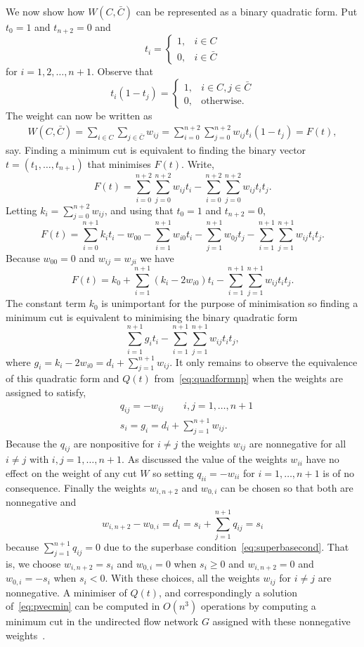 \documentclass[final,leqno]{siamltex}
\begin{document}
We now show how $W(C,\bar{C})$ can be represented as a binary quadratic form.  Put $t_0 = 1$ and $t_{n+2} = 0$ and
\[
t_i = \begin{cases}
1, & i \in C \\
0, & i \in \bar{C}
\end{cases}
\]
for $i = 1,2,\dots,n+1$.  Observe that
\[
t_i(1 - t_j) = \begin{cases}
1, & i \in C, j \in \bar{C} \\
0, & \text{otherwise}.
\end{cases}
\]
The weight can now be written as
\begin{align*}
W(C,\bar{C}) = \sum_{i \in C} \sum_{j \in \bar{C}} w_{ij} = \sum_{i =0}^{n+2} \sum_{j =0}^{n+2} w_{ij} t_i (1 - t_j) = F(t),
\end{align*}
say.  Finding a minimum cut is equivalent to finding the binary vector $t = (t_1, \dots, t_{n+1})$ that minimises $F(t)$.  Write,
\[
F(t) =  \sum_{i=0}^{n+2} \sum_{j =0}^{n+2} w_{ij}t_i - \sum_{i=0}^{n+2} \sum_{j =0}^{n+2} w_{ij} t_it_j.
\]
Letting $k_i = \sum_{j =0}^{n+2} w_{ij}$, and using that $t_0 = 1$ and $t_{n+2} = 0$,
\[
F(t) = \sum_{i=0}^{n+1}k_it_i  - w_{00} - \sum_{i=1}^{n+1} w_{i0} t_i - \sum_{j=1}^{n+1} w_{0j} t_j - \sum_{i=1}^{n+1} \sum_{j =1}^{n+1} w_{ij} t_it_j.
\]
Because $w_{00} = 0$ and $w_{ij} = w_{ji}$ we have
\[
F(t) = k_0 + \sum_{i=1}^{n+1}( k_i  - 2 w_{i0}) t_i  - \sum_{i=1}^{n+1} \sum_{j =1}^{n+1} w_{ij} t_it_j.
\]
The constant term $k_0$ is unimportant for the purpose of minimisation so finding a minimum cut is equivalent to minimising the binary quadratic form
\[
\sum_{i=1}^{n+1}g_i t_i  - \sum_{i=1}^{n+1} \sum_{j =1}^{n+1} w_{ij} t_it_j,
\]
where $g_i = k_i  - 2 w_{i0} = d_i + \sum_{j=1}^{n+1} w_{ij}$.  It only remains to observe the equivalence of this quadratic form and $Q(t)$ from~\eqref{eq:quadformnp} when the weights are assigned to satisfy,
\begin{align*}
&q_{ij} = - w_{ij} \qquad i,j = 1,\dots,n+1 \\
&s_i = g_i = d_i + \sum_{j=1}^{n+1} w_{ij}.
\end{align*}
Because the $q_{ij}$ are nonpositive for $i \neq j$ the weights $w_{ij}$ are nonnegative for all $i \neq j$ with $i,j = 1,\dots,n+1$.  As discussed the value of the weights $w_{ii}$ have no effect on the weight of any cut $W$ so setting $q_{ii} = - w_{ii}$ for  $i = 1,\dots,n+1$ is of no consequence.  Finally the weights $w_{i,n+2}$ and $w_{0,i}$ can be chosen so that both are nonnegative and 
\[
w_{i,n+2} - w_{0,i} = d_i = s_i + \sum_{j=1}^{n+1} q_{ij} = s_i
\]  
because $\sum_{j=1}^{n+1} q_{ij} = 0$ due to the superbase condition~\eqref{eq:superbasecond}.  That is, we choose $w_{i,n+2} = s_i$ and $w_{0,i} = 0$ when $s_i \geq 0$ and $w_{i,n+2}=0$ and $w_{0,i} = -s_i$ when $s_i < 0$.  With these choices, all the weights $w_{ij}$ for $i \neq j$ are nonnegative.  A minimiser of $Q(t)$, and correspondingly a solution of~\eqref{eq:pvecmin} can be computed in $O(n^3)$ operations by computing a minimum cut in the undirected flow network $G$ assigned with these nonnegative weights~\cite{Picard_min_cuts_1974,Sankaran_solving_CDMA_mincut_1998,Ulukus_cdma_mincut_1998,Cormen2001}.  %
\end{document}
